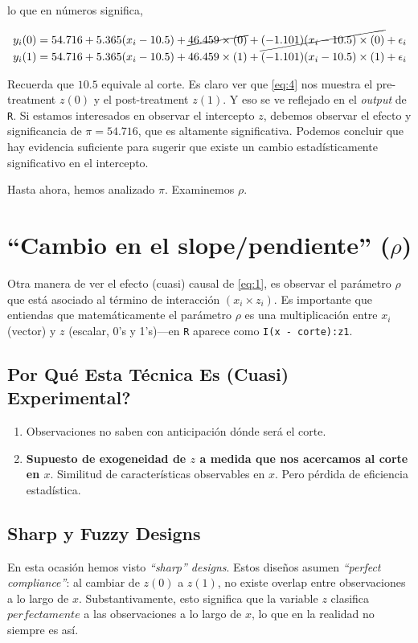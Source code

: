\documentclass[10pt]{article}
\begin{document}
lo que en n\'umeros significa,

\begin{equation} \label{eq:4}
\begin{split}
y_{i}(0) &= 54.716 + 5.365(x_{i}-10.5) + \cancel{46.459\times(0)} + \cancel{(-1.101)(x_{i}-10.5) \times (0)} +  \epsilon_{i} \\
y_{i}(1) &= 54.716 + 5.365(x_{i}-10.5) + 46.459\times(1) + (-1.101)(x_{i}-10.5) \times (1) +  \epsilon_{i}
\end{split}
\end{equation}


Recuerda que $10.5$ equivale al corte. Es claro ver que \autoref{eq:4} nos muestra el pre-treatment $z(0)$ y el post-treatment $z(1)$. Y eso se ve reflejado en el \emph{output} de \texttt{R}. Si estamos interesados en observar el intercepto $z$, debemos observar el efecto y significancia de $\pi=54.716$, que es altamente significativa. Podemos concluir que hay evidencia suficiente para sugerir que existe un cambio estad\'isticamente significativo en el intercepto.

Hasta ahora, hemos analizado $\pi$. Examinemos $\rho$.


\section*{``Cambio en el slope/pendiente'' ($\rho$)}

Otra manera de ver el efecto (cuasi) causal de \autoref{eq:1}, es observar el par\'ametro $\rho$ que est\'a asociado al t\'ermino de interacci\'on $(x_{i}\times z_{i})$. Es importante que entiendas que matem\'aticamente el par\'ametro  $\rho$ es una multiplicaci\'on entre $x_{i}$ (vector) y $z$ (escalar, 0's y 1's)---en \texttt{R} aparece como \texttt{I(x - corte):z1}.


\subsection*{Por Qu\'e Esta T\'ecnica Es (Cuasi) Experimental?}

\begin{enumerate}
	\item Observaciones no saben con anticipaci\'on d\'onde ser\'a el corte.
	\item {\bf Supuesto de exogeneidad de $z$ a medida que nos acercamos al corte en $x$}.  Similitud de caracter\'isticas observables en $x$. Pero p\'erdida de eficiencia estad\'istica.
\end{enumerate}


\subsection*{Sharp y Fuzzy Designs}

En esta ocasi\'on hemos visto \emph{``sharp'' designs}. Estos dise\~nos asumen \emph{``perfect compliance''}: al cambiar de $z(0)$ a $z(1)$, no existe overlap entre observaciones a lo largo de $x$. Substantivamente, esto significa que la variable $z$ clasifica $perfectamente$ a las observaciones a lo largo de $x$, lo que en la realidad no siempre es as\'i.
\end{document}
